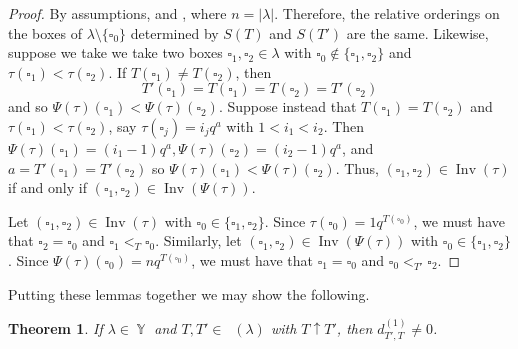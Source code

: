 \documentclass[10pt,a4paper]{amsart}
\numberwithin{equation}{section}
\newtheorem{Theorem}{Theorem}[section]
\theoremstyle{definition}
\DeclareMathOperator{\Par}{\mathbb{Y}}
\DeclareMathOperator{\RSSYT}{\mathrm{RSSYT}_{\geq 0}}
\DeclareMathOperator{\Inv}{\mathrm{Inv}}
\begin{document}
\begin{proof}
By assumptions,  and , where $n = |\lambda| $. Therefore, the relative orderings on the boxes of $\lambda \setminus \{\square_0\}$ determined by $S(T)$ and $S(T')$ are the same. Likewise, suppose we take we take two boxes $\square_1,\square_2 \in \lambda$ with $\square_0 \notin \{\square_1,\square_2\}$ and $\tau(\square_1) < \tau(\square_2)$. If $T(\square_1) \neq T(\square_2)$, then
\[
T'(\square_1) = T(\square_1) = T(\square_2) = T'(\square_2)
\]
 and so $\Psi(\tau)(\square_1) < \Psi(\tau)(\square_2)$. Suppose instead that $T(\square_1) = T(\square_2)$ and $\tau(\square_1) < \tau(\square_2)$, say $\tau(\square_j) = i_jq^{a}$ with $1< i_1 <i_2$. Then $\Psi(\tau)(\square_1) = (i_1-1)q^{a}, \Psi(\tau)(\square_2) = (i_2-1)q^{a}$, and $a = T'(\square_1) = T'(\square_2)$ so $\Psi(\tau)(\square_1) < \Psi(\tau)(\square_2)$. Thus, $(\square_1,\square_2) \in \Inv(\tau)$ if and only if $(\square_1,\square_2) \in \Inv(\Psi(\tau))$.

Let $(\square_1,\square_2) \in \Inv(\tau)$ with $\square_0 \in \{\square_1,\square_2\}$. Since $\tau(\square_0) = 1q^{T(\square_0)}$, we must have that $\square_2 = \square_0$ and $\square_1 <_{T} \square_0$. Similarly, let $(\square_1,\square_2) \in \Inv(\Psi(\tau))$ with $\square_0 \in \{\square_1,\square_2\}$. Since $\Psi(\tau)(\square_0) = nq^{T(\square_0)}$, we must have that $\square_1 = \square_0$ and $\square_0 <_{T'} \square_2$.
\end{proof}

Putting these lemmas together we may show the following.


\begin{Theorem}\label{non-vanishing of e_1 Pieri}
 If $\lambda \in \Par$ and $T,T' \in \RSSYT(\lambda)$ with $T \uparrow T'$, then $d_{T',T}^{(1)} \neq 0$.
\end{Theorem}
\end{document}
